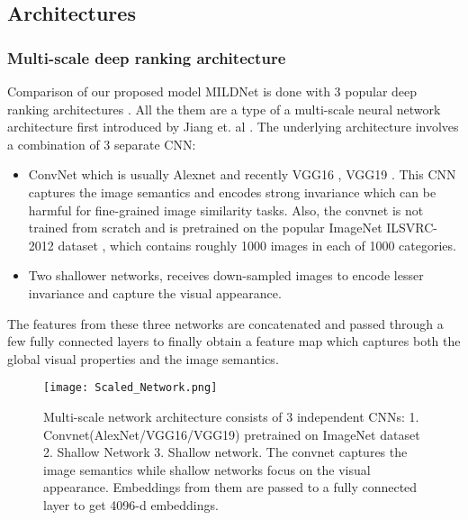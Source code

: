 \documentclass[10pt,twocolumn,letterpaper]{article}
\begin{document}
\subsection{Architectures}
\subsubsection{Multi-scale deep ranking architecture}
Comparison of our proposed model MILDNet is done with 3 popular deep ranking architectures \cite{c1,c2,c3}. All the them are a type of a multi-scale neural network architecture first introduced by Jiang et. al \cite{c1}. The underlying architecture involves a combination of 3 separate CNN:
\vspace{-2mm}
\begin{itemize}
\item ConvNet which is usually Alexnet \cite{c15} and recently VGG16 \cite{c30}, VGG19 \cite{c30}. This CNN captures the image semantics and encodes strong invariance which can be harmful for fine-grained image similarity tasks. Also, the convnet is not trained from scratch and is pretrained on the popular ImageNet ILSVRC-2012 dataset \cite{c31}, which contains roughly 1000 images in each of 1000 categories.
\item Two shallower networks, receives down-sampled images to encode lesser invariance and capture the visual appearance.
\end{itemize}
The features from these three networks are concatenated and passed through a few fully connected layers to finally obtain a feature map which captures both the global visual properties and the image semantics.

\begin{figure}[htp]
\centering
\texttt{[image: Scaled\_Network.png]}
\caption{Multi-scale network architecture consists of 3 independent CNNs: 1. Convnet(AlexNet/VGG16/VGG19) pretrained on ImageNet dataset 2. Shallow Network 3. Shallow network. The convnet captures the image semantics while shallow networks focus on the visual appearance. Embeddings from them are passed to a fully connected layer to get 4096-d embeddings.}
\label{fig:scaled_network}
\end{figure}
\end{document}
